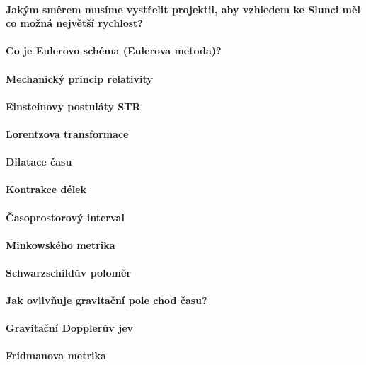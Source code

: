 \documentclass[11pt,a4paper,notitlepage,twocolumn]{article}
\begin{document}
\paragraph{Jakým směrem musíme vystřelit projektil, 
	aby vzhledem ke Slunci měl co možná největší rychlost?}
\paragraph{Co je Eulerovo schéma (Eulerova metoda)?}
\paragraph{Mechanický princip relativity}
\paragraph{Einsteinovy postuláty STR}
\paragraph{Lorentzova transformace}
\paragraph{Dilatace času}
\paragraph{Kontrakce délek}
\paragraph{Časoprostorový interval}
\paragraph{Minkowského metrika}
\paragraph{Schwarzschildův poloměr}
\paragraph{Jak ovlivňuje gravitační pole chod času?}
\paragraph{Gravitační Dopplerův jev}
\paragraph{Fridmanova metrika}
\end{document}
